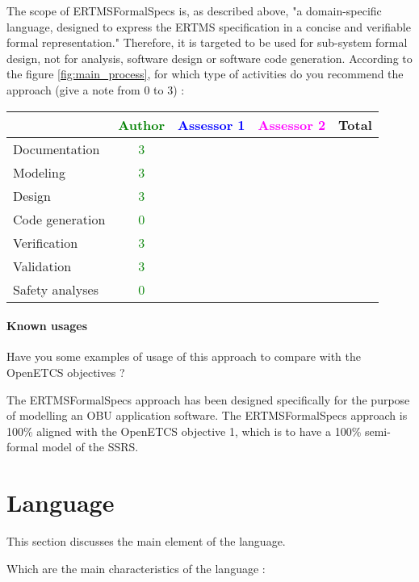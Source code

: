 \begin{author_comment}
The scope of ERTMSFormalSpecs is, as described above, "a domain-specific language, designed to express the ERTMS specification in a concise and verifiable formal representation."
Therefore, it is targeted to be used for sub-system formal design, not for analysis, software design or software code generation.
According to the figure \ref{fig:main_process}, for which type of activities do you recommend the approach (give a note from 0 to  3) :

\begin{tabular}{|l | c | c | c | c|}
\hline
& \textcolor{green}{Author} & \textcolor{blue}{Assessor 1} & \textcolor{magenta}{Assessor 2} & Total \\
\hline 
Documentation & \textcolor{green}{3} & & &  \\
\hline
Modeling & \textcolor{green}{3} & & &  \\
\hline
Design & \textcolor{green}{3} & & & \\
\hline
Code generation & \textcolor{green}{0} & & & \\
\hline
Verification & \textcolor{green}{3} & & & \\
\hline
Validation & \textcolor{green}{3} & & & \\
\hline
Safety analyses & \textcolor{green}{0} & & & \\
\hline
\end{tabular}

\paragraph{Known usages} Have you some examples of usage of this approach to  compare with the OpenETCS objectives ?

The ERTMSFormalSpecs approach has been designed specifically for the purpose of modelling an OBU application software. The ERTMSFormalSpecs approach is 100\% aligned with the OpenETCS objective 1, which is to have a 100\% semi-formal model of the SSRS. 
\section{Language}
This section discusses the main element of the language.

Which are the main characteristics of the language :


\end{author_comment}

